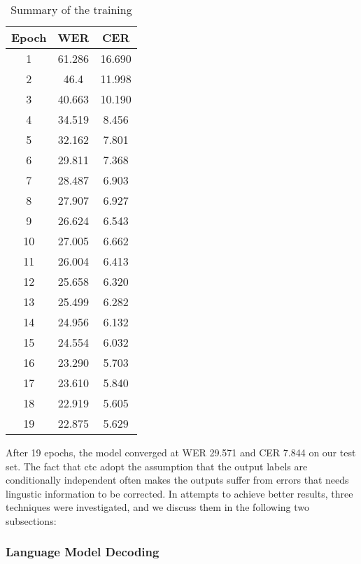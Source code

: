 \begin{table}[!ht]
\centering
\begin{tabular}{|c|c|c|}
	\hline
	Epoch & WER    & CER    \\ \hline
	1     & 61.286 & 16.690 \\ \hline
	2     & 46.4 & 11.998 \\ \hline
	3     & 40.663 & 10.190 \\ \hline
	4     & 34.519 & 8.456  \\ \hline
	5     & 32.162 & 7.801  \\ \hline
	6     & 29.811 & 7.368  \\ \hline
	7     & 28.487 & 6.903  \\ \hline
	8     & 27.907 & 6.927  \\ \hline
	9     & 26.624 & 6.543  \\ \hline
	10    & 27.005 & 6.662  \\ \hline
	11    & 26.004 & 6.413  \\ \hline
	12    & 25.658 & 6.320  \\ \hline
	13    & 25.499 & 6.282  \\ \hline
	14    & 24.956 & 6.132  \\ \hline
	15    & 24.554 & 6.032  \\ \hline
	16    & 23.290 & 5.703  \\ \hline
	17    & 23.610 & 5.840  \\ \hline
	18    & 22.919 & 5.605  \\ \hline
	19    & 22.875 & 5.629  \\ \hline
\end{tabular}
\caption{Summary of the training}
\label{table:train19}
\end{table}




After 19 epochs, the model converged at \ac{WER} 29.571 and \ac{CER} 7.844 on our test set.  The fact that ctc adopt the assumption that the output labels are conditionally independent often makes the outputs suffer from errors that needs lingustic information to be corrected. In attempts to achieve better results, three techniques were investigated, and we discuss them in the following two subsections:

\subsubsection{Language Model Decoding}

